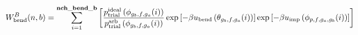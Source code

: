 \documentclass[12pt]{article}
\begin{document}
\begin{displaymath}
W_{\rm bend}^{B}(n,b) =
\sum_{i=1}^{\bf nch\_bend\_b}
\left[
{{p_{\rm trial}^{\rm ideal}\left(\phi_{g_b,f,g_a}(i)\right)}\over{ p_{\rm trial}^{\rm arb}\left(\phi_{g_b,f,g_a}(i)\right)}}
\exp\left[-\beta u_{\rm bend}\left(\theta_{g_b,f,g_a}(i)\right)\right]
\exp\left[-\beta u_{\rm imp}\left(\phi_{p,f,g_a,g_b}(i)\right)\right]
\right]
\end{displaymath}
\end{document}

